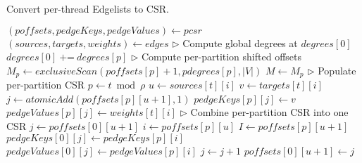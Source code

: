 \begin{algorithm}[hbtp]
\caption{Convert per-thread Edgelists to CSR.}
\label{alg:load-csr}
\begin{algorithmic}[1]

\Statex

  \State $(\textit{poffsets}, pedgeKeys, pedgeValues) \gets pcsr$ \label{alg:csr--initialize-begin}
  \State $(sources, targets, weights) \gets edges$ \label{alg:csr--initialize-end}
  \State $\rhd$ Compute global degrees at $degrees[0]$
  \ForAll{$u \in [0, |V|)$ \textbf{in parallel}}
    \ForAll{$p \in [1, \rho)$} $degrees[0]\ \text{+=}\ degrees[p]$
    \EndFor
  \EndFor
  \State $\rhd$ Compute per-partition shifted offsets
  \ForAll{$p \in [0, \rho)$} \label{alg:csr--poffsets-begin}
    \State $M_p \gets exclusiveScan(\textit{poffsets}[p]+1, \textit{pdegrees}[p], |V|)$
     $M \gets M_p$
    \EndIf
  \EndFor \label{alg:csr--poffsets-end}
  \State $\rhd$ Populate per-partition CSR
   \label{alg:csr--pcsr-begin}
    \State $p \gets t \bmod \rho$
    \ForAll{$i \in [0, counts[t])$}
      \State $u \gets sources[t][i]$
      \State $v \gets targets[t][i]$
      \State $j \gets atomicAdd(\textit{poffsets}[p][u+1], 1)$
      \State $pedgeKeys[p][j] \gets v$
        \State $pedgeValues[p][j] \gets weights[t][i]$
      \EndIf
    \EndFor
  \EndFor \label{alg:csr--pcsr-end}
  \State $\rhd$ Combine per-partition CSR into one CSR
  \ForAll{$u \in [0, |V|)$ \textbf{in parallel}} \label{alg:csr--pcsr-combine-begin}
    \State $j \gets \textit{poffsets}[0][u+1]$
    \ForAll{$p \in [1, \rho)$}
      \State $i \gets \textit{poffsets}[p][u]$
      \State $I \gets \textit{poffsets}[p][u+1]$
      \ForAll{$i \in [i, I)$}
        \State $pedgeKeys[0][j] \gets pedgeKeys[p][i]$
          \State $pedgeValues[0][j] \gets pedgeValues[p][i]$
        \EndIf
        \State $j \gets j + 1$
      \EndFor
    \EndFor
    \State $\textit{poffsets}[0][u+1] \gets j$
  \EndFor \label{alg:csr--pcsr-combine-end}
\EndFunction
\end{algorithmic}
\end{algorithm}
